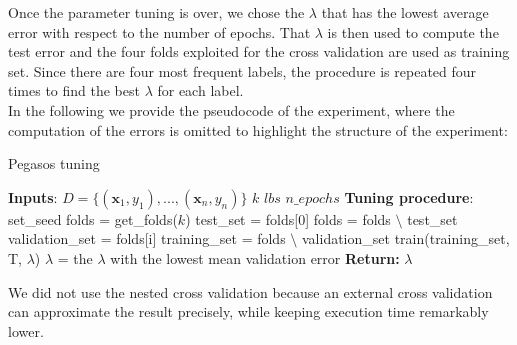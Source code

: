 \documentclass{article}
\begin{document}
Once the parameter tuning is over, we chose the $\lambda$ that has the lowest average error with respect to the number of epochs. That $\lambda$ is then used to compute the test error and the four folds exploited for the cross validation are used as training set.
Since there are four most frequent labels, the procedure is repeated four times to find the best $\lambda$ for each label. \\
In the following we provide the pseudocode of the experiment, where the computation of the errors is omitted to highlight the structure of the experiment:
\begin{algorithm} [H]
   \caption{Pegasos tuning}
    \begin{algorithmic}[1]
        \State \textbf{Inputs}: 
        \State  $ D = \{(\textbf{x}_1,y_1), ..., (\textbf{x}_n,y_n) \}$  
        \State $k$ 
        \State  $lbs$ 
        \State $n\_epochs$ 
        \State \textbf{Tuning procedure}: 
        \State set\_seed 
        \State folds = get\_folds($k$) 
        \State test\_set = folds[0]
        \State  folds  = folds $ \setminus$ test\_set  
 	              
 	                \State validation\_set = folds[i]
 	                \State training\_set = folds $\setminus$ validation\_set
 	                \State  train(training\_set, T, $\lambda$) 
 	            \EndFor
 		    \EndFor
 		\EndFor
 		\State  $\lambda$ =  the  $\lambda$ with the lowest mean validation error
 		\State \textbf{Return:} $\lambda$
\end{algorithmic}
\end{algorithm}
\noindent We did not use the nested cross validation because an external cross validation can approximate the result precisely, while keeping execution time remarkably lower.
\end{document}
